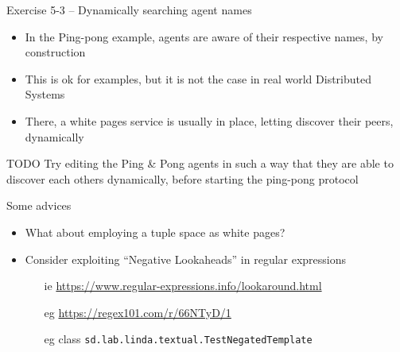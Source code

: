 \documentclass[presentation]{beamer}\mode<presentation>{\usetheme{AMSCesenaPurpleAndGold}}
\begin{document}
\begin{frame}[allowframebreaks]{Exercise 5-3 -- Dynamically searching agent names}

\begin{itemize}
    \item In the Ping-pong example, agents are aware of their respective names, \alert{by construction}
    
    \vspace{.3cm}
    
    \item This is ok for examples, but \alert{it is not the case} in real world Distributed Systems
    
    \vspace{.3cm}
    
    \item There, a \alert{white pages} service is usually in place, letting \alert{discover} their peers, \alert{dynamically} 
    
\end{itemize}

\vspace{.3cm}

\begin{block}{TODO}
    Try editing the Ping \& Pong agents in such a way that they are able to \alert{discover} each others dynamically, \alert{before} starting the ping-pong protocol
\end{block}

\framebreak

\begin{exampleblock}{Some advices}
    \begin{itemize}
        \item What about employing a \alert{tuple space} as white pages?
        
        \item Consider exploiting ``Negative Lookaheads'' in regular expressions
        \begin{itemize}
            \item[ie] \url{https://www.regular-expressions.info/lookaround.html}
            \item[eg] \url{https://regex101.com/r/66NTyD/1}
            \item[eg] class \texttt{sd.lab.linda.textual.\alert{TestNegatedTemplate}}
        \end{itemize}
    \end{itemize}
\end{exampleblock}

\end{frame}
\end{document}
